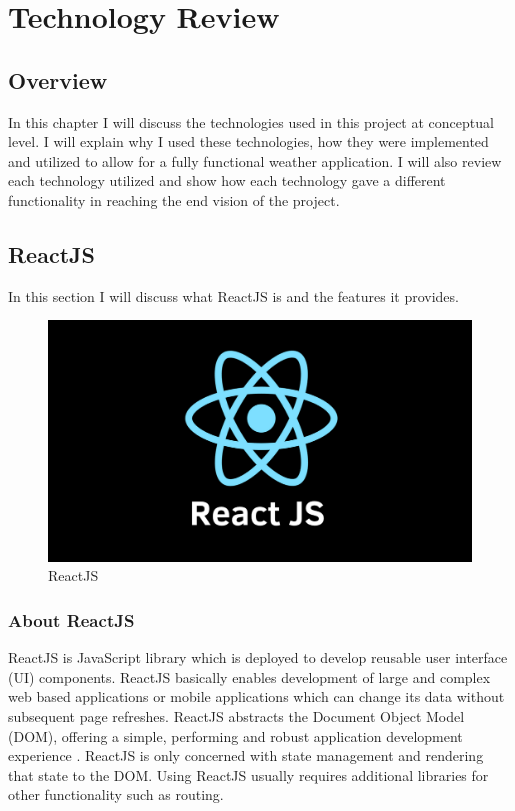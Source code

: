 \chapter{Technology Review}
\section{Overview}
In this chapter I will discuss the technologies used in this project at conceptual level. I will explain why I used these technologies, how they were implemented and utilized to allow for a fully functional weather application. I will also review each technology utilized and show how each technology gave a different functionality in reaching the end vision of the project. 

\section{ReactJS}
In this section I will discuss what ReactJS is and the features it provides.

\begin{figure}[h]
\centering
\includegraphics[scale=0.2]{img/ReactJS.png}
\caption{ReactJS}
\label{React}
\end{figure}

\subsection{About ReactJS}
ReactJS is JavaScript library which is deployed to develop reusable user interface (UI) components. ReactJS basically enables development of large and complex web based applications or mobile applications which can change its data without subsequent page refreshes. ReactJS abstracts the Document Object Model (DOM), offering a simple, performing and robust application development experience \cite{aggarwal2018modern}. ReactJS is only concerned with state management and rendering that state to the DOM. Using ReactJS usually requires additional libraries for other functionality such as routing.



